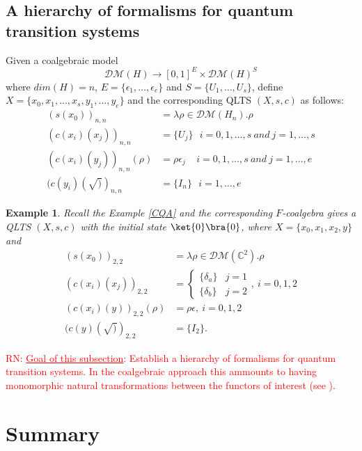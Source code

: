 \documentclass[a4paper, 11pt]{article}
\newtheorem{example}{Example}
\newcommand{\nevComment}[1]{\textcolor{red}{RN: #1}}
\begin{document}
\subsection{A hierarchy of formalisms for quantum transition systems}
Given a coalgebraic model $$\mathcal{DM}(H)\rightarrow [0,1]^{E}\times \mathcal{DM}(H)^{S}$$
where $dim(H)=n$, $E=\{\epsilon_{1},\dots,\epsilon_{e}\}$ and $S=\{U_1,\dots,U_s\}$, define $X=\{x_0,x_1,\dots,x_s,y_1,\dots,y_e\}$ and the corresponding QLTS $(X,s,c)$ as follows:
$$
\begin{aligned}
(s(x_0))_{n,n}&=\lambda \rho\in \mathcal{DM}(H_n). \rho\\
(c(x_i)(x_j))_{n,n}&=\{U_j\}\ \ \ i=0,1,\dots,s\ and\ j=1,\dots,s\\
(c(x_i)(y_j))_{n,n}(\rho)&=\rho \epsilon_{j}\ \ \ \ \ i=0,1,\dots,s\ and\ j=1,\dots,e\\
(c(y_i)(\surd))_{n,n}&=\{I_n\}\ \ \ i=1,\dots,e
\end{aligned}
$$

\begin{example}
Recall  the Example \ref{CQA} and the corresponding $F$-coalgebra gives a QLTS $(X,s,c)$ with the initial state $\ket{0}\bra{0}$, where $X=\{x_0,x_1,x_2,y\}$ and 
$$
\begin{aligned}
(s(x_0))_{2,2}&=\lambda \rho\in \mathcal{DM}(\mathbb{C}^{2}). \rho\\
(c(x_i)(x_j))_{2,2}&=\begin{cases}
\{\delta_a\} &j=1\\
\{\delta_b\} &j=2
\end{cases},\ i=0,1,2\\
(c(x_i)(y))_{2,2}(\rho)&=\rho \epsilon,\ i=0,1,2\\
(c(y)(\surd))_{2,2}&=\{I_2\}.
\end{aligned}
$$


\end{example}



\nevComment{\underline{Goal of this subsection}: Establish a hierarchy
  of formalisms for quantum transition systems. In the coalgebraic
  approach this ammounts to having monomorphic natural transformations
  between the functors of interest (see \cite[Section 4.4]{sokolova}).
}

\section{Summary}
\end{document}
